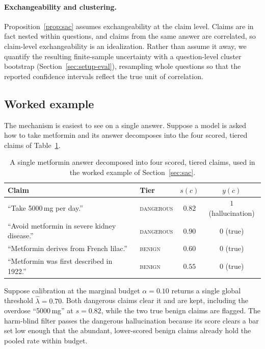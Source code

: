 \paragraph{Exchangeability and clustering.}
Proposition~\ref{prop:sac} assumes exchangeability at the claim level. Claims are
in fact nested within questions, and claims from the same answer are correlated, so
claim-level exchangeability is an idealization. Rather than assume it away, we
quantify the resulting finite-sample uncertainty with a question-level cluster
bootstrap (Section~\ref{sec:setup-eval}), resampling whole questions so that the
reported confidence intervals reflect the true unit of correlation.

\subsection{Worked example}
\label{sec:example}
The mechanism is easiest to see on a single answer. Suppose a model is asked how to
take metformin and its answer decomposes into the four scored, tiered claims of
Table~\ref{tab:worked-example}.

\begin{table}[t]
\centering
\small
\begin{tabular}{llcc}
\toprule
Claim & Tier & $s(c)$ & $y(c)$ \\
\midrule
``Take 5000\,mg per day.'' & \textsc{dangerous} & $0.82$ & $1$ (hallucination) \\
``Avoid metformin in severe kidney disease.'' & \textsc{dangerous} & $0.90$ & $0$ (true) \\
``Metformin derives from French lilac.'' & \textsc{benign} & $0.60$ & $0$ (true) \\
``Metformin was first described in 1922.'' & \textsc{benign} & $0.55$ & $0$ (true) \\
\bottomrule
\end{tabular}
\caption{A single metformin answer decomposed into four scored, tiered claims,
used in the worked example of Section~\ref{sec:sac}.}
\label{tab:worked-example}
\end{table}

Suppose calibration at the marginal budget $\alpha = 0.10$ returns a single global
threshold $\widehat{\lambda} = 0.70$. Both dangerous claims clear it and are kept,
including the overdose ``5000\,mg'' at $s = 0.82$, while the two true benign claims
are flagged. The harm-blind filter passes the dangerous hallucination because its
score clears a bar set low enough that the abundant, lower-scored benign claims
already hold the pooled rate within budget.

